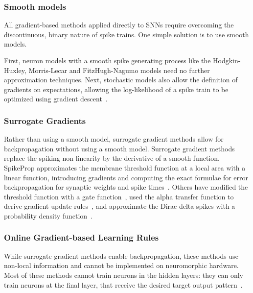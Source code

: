 \documentclass[fyp]{socreport}
\begin{document}
\subsubsection{Smooth models}

All gradient-based methods applied directly to SNNs require overcoming the
discontinuous, binary nature of spike trains. One simple solution is to use
smooth models.

First, neuron models with a smooth spike generating process like the
Hodgkin-Huxley, Morris-Lecar and FitzHugh-Nagumo models need no further
approximation techniques. Next, stochastic models also allow the definition of
gradients on expectations, allowing the log-likelihood of a spike train to be
optimized using gradient descent~\cite{pfister06_optim_spike_timin_depen_plast}.

\subsubsection{Surrogate Gradients\label{sec:surrogate-gradients}}

Rather than using a smooth model, surrogate gradient methods allow for
backpropagation without using a smooth model. Surrogate gradient methods replace
the spiking non-linearity by the derivative of a smooth function. SpikeProp
approximates the membrane threshold function at a local area with a linear
function, introducing gradients and computing the exact formulae for error
backpropagation for synaptic weights and spike times~\cite{spikeprop}. Others
have modified the threshold function with a gate function~\cite{NIPS2018_7417},
used the alpha transfer function to derive gradient update
rules~\cite{comsa19_tempor_codin_spikin_neural_networ}, and approximate the
Dirac delta spikes with a probability density function~\cite{NIPS2018_7415}.

\subsubsection{Online Gradient-based Learning Rules}

While surrogate gradient methods enable backpropagation, these methods use
non-local information and cannot be implemented on neuromorphic hardware. Most
of these methods cannot train neurons in the hidden layers: they can only train
neurons at the final layer, that receive the desired target output
pattern~\cite{urbanczik09_gradien_learn_rule_tempot,training_deep_snn_bpp_lee}.
\end{document}
